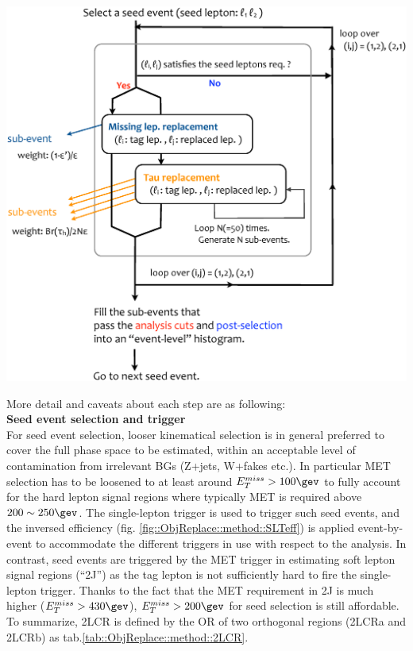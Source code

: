 \includegraphics[width=160mm]{figures/BGestimation/ObjReplacement/method/flow_replacement.eps}
\label{fig::ObjReplace::schematic2}

More detail and caveats about each step are as following:  \\

\noindent \textbf{Seed event selection and trigger} \\
For seed event selection, looser kinematical selection is in general preferred to cover the full phase space to be estimated, within an acceptable level of contamination from irrelevant BGs (Z+jets, W+fakes etc.). 
In particular MET selection has to be loosened to at least around $E_{T}^{miss}>100\gev$ to fully account for the hard lepton signal regions where typically MET is required above $200\sim250\gev$. The single-lepton trigger is used to trigger such seed events, and the inversed efficiency (fig. \ref{fig::ObjReplace::method::SLTeff}) is applied event-by-event to accommodate the different triggers in use with respect to the analysis. In contrast, seed events are triggered by the MET trigger in estimating soft lepton signal regions (``2J'') as the tag lepton is not sufficiently hard to fire the single-lepton trigger. Thanks to the fact that the MET requirement in 2J is much higher ($E_{T}^{miss}>430\gev$), $E_{T}^{miss}>200\gev$ for seed selection is still affordable. To summarize, 2LCR is defined by the OR of two orthogonal regions (2LCRa and 2LCRb) as tab.\ref{tab::ObjReplace::method::2LCR}. \\

